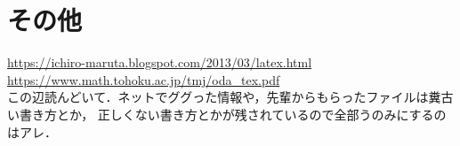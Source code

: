\documentclass[lualatex,a4paper,ja = standard, twoside, twocolumn]{bxjsarticle}
\begin{document}
\section{その他}
  \noindent \url{https://ichiro-maruta.blogspot.com/2013/03/latex.html} \\
  \url{https://www.math.tohoku.ac.jp/tmj/oda_tex.pdf}\\
  この辺読んどいて．ネットでググった情報や，先輩からもらったファイルは糞古い書き方とか，
  正しくない書き方とかが残されているので全部うのみにするのはアレ．
\end{document}
